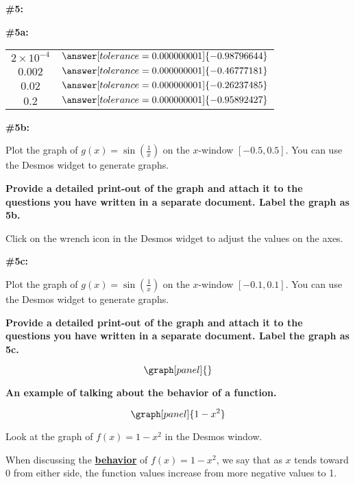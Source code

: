 \documentclass[handout,nooutcomes]{ximera}
\begin{document}
\begin{problem}{\textbf{\#5:}}
\begin{problem}{\textbf{\#5a:}}
\begin{tabular}{|c|c|}
		$2\times10^{-4}$ & $\answer[tolerance=0.000000001]{-0.98796644}$ \\
		
		$0.002$ & $\answer[tolerance=0.000000001]{-0.46777181}$ \\
		
		$0.02$ & $\answer[tolerance=0.000000001]{-0.26237485}$ \\
		
		$0.2$ & $\answer[tolerance=0.000000001]{-0.95892427}$ \\
		
\end{tabular}
\end{problem}



\begin{problem}{\textbf{\#5b:}}

Plot the graph of $g(x)=\sin\left(\frac{1}{x}\right)$ on the $x$-window $[-0.5,0.5]$. You can use the Desmos widget to generate graphs. 

\textbf{Provide a detailed print-out of the graph and attach it to the questions you have written in a separate document. Label the graph as 5b.}

\begin{hint}
Click on the wrench icon in the Desmos widget to adjust the values on the axes.
\end{hint}


\end{problem}

\begin{problem}{\textbf{\#5c:}}

Plot the graph of $g(x)=\sin\left(\frac{1}{x}\right)$ on the $x$-window $[-0.1,0.1]$. You can use the Desmos widget to generate graphs. 

\textbf{Provide a detailed print-out of the graph and attach it to the questions you have written in a separate document. Label the graph as 5c.}

\end{problem}

\[
\graph[panel]{}
\]

\end{problem}


\begin{example}{\textbf{An example of talking about the behavior of a function.}}

\[
\graph[panel]{1-x^2}
\]

Look at the graph of $f(x)=1-x^2$ in the Desmos window. 

When discussing the \underline{\textbf{behavior}} of $f(x)=1-x^2$, we say that as $x$ tends toward 0 from either side, the function values increase from more negative values to 1.

\end{example}
\end{document}
